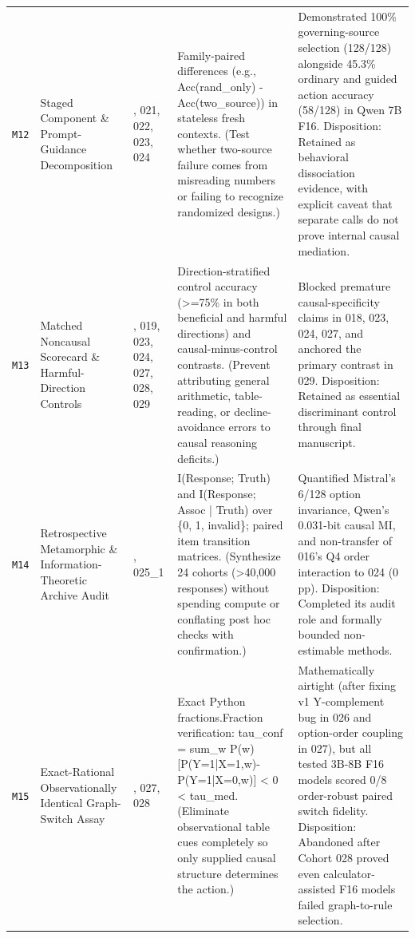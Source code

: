 {\begin{longtable}{@{}>{\raggedright\arraybackslash}p{0.9cm}>{\raggedright\arraybackslash}p{2.7cm}>{\raggedright\arraybackslash}p{1.7cm}>{\raggedright\arraybackslash}p{4.4cm}>{\raggedright\arraybackslash}p{4.7cm}@{}}
\texttt{M12} & Staged Component \& Prompt-\allowbreak{}Guidance Decomposition & 020, 021, 022, 023, 024 & Family-\allowbreak{}paired differences (e.g., Acc(rand\_only) -\allowbreak{} Acc(two\_source)) in stateless fresh contexts. (Test whether two-\allowbreak{}source failure comes from misreading numbers or failing to recognize randomized designs.) & Demonstrated 100\% governing-\allowbreak{}source selection (128/\allowbreak{}128) alongside 45.3\% ordinary and guided action accuracy (58/\allowbreak{}128) in Qwen 7B F16. Disposition: Retained as behavioral dissociation evidence, with explicit caveat that separate calls do not prove internal causal mediation. \\[2pt]
\texttt{M13} & Matched Noncausal Scorecard \& Harmful-\allowbreak{}Direction Controls & 018, 019, 023, 024, 027, 028, 029 & Direction-\allowbreak{}stratified control accuracy (>=75\% in both beneficial and harmful directions) and causal-\allowbreak{}minus-\allowbreak{}control contrasts. (Prevent attributing general arithmetic, table-\allowbreak{}reading, or decline-\allowbreak{}avoidance errors to causal reasoning deficits.) & Blocked premature causal-\allowbreak{}specificity claims in 018, 023, 024, 027, and anchored the primary contrast in 029. Disposition: Retained as essential discriminant control through final manuscript. \\[2pt]
\texttt{M14} & Retrospective Metamorphic \& Information-\allowbreak{}Theoretic Archive Audit & 025, 025\_1 & I(Response; Truth) and I(Response; Assoc | Truth) over \{0, 1, invalid\}; paired item transition matrices. (Synthesize 24 cohorts (>40,000 responses) without spending compute or conflating post hoc checks with confirmation.) & Quantified Mistral's 6/\allowbreak{}128 option invariance, Qwen's 0.031-\allowbreak{}bit causal MI, and non-\allowbreak{}transfer of 016's Q4 order interaction to 024 (0 pp). Disposition: Completed its audit role and formally bounded non-\allowbreak{}estimable methods. \\[2pt]
\texttt{M15} & Exact-\allowbreak{}Rational Observationally Identical Graph-\allowbreak{}Switch Assay & 026, 027, 028 & Exact Python fractions.Fraction verification: tau\_conf = sum\_w P(w)[P(Y=1|X=1,w)-\allowbreak{}P(Y=1|X=0,w)] < 0 < tau\_med. (Eliminate observational table cues completely so only supplied causal structure determines the action.) & Mathematically airtight (after fixing v1 Y-\allowbreak{}complement bug in 026 and option-\allowbreak{}order coupling in 027), but all tested 3B-\allowbreak{}8B F16 models scored 0/\allowbreak{}8 order-\allowbreak{}robust paired switch fidelity. Disposition: Abandoned after Cohort 028 proved even calculator-\allowbreak{}assisted F16 models failed graph-\allowbreak{}to-\allowbreak{}rule selection. \\[2pt]

\end{longtable}}
